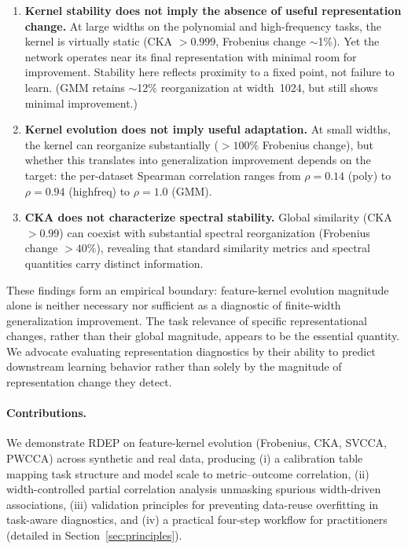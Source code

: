 \documentclass[10pt]{article}
\begin{document}
\begin{enumerate}
    \item \textbf{Kernel stability does not imply the absence of useful representation change.}  At large widths on the polynomial and high-frequency tasks, the kernel is virtually static (CKA $>0.999$, Frobenius change $\sim$1\%). Yet the network operates near its final representation with minimal room for improvement. Stability here reflects proximity to a fixed point, not failure to learn.  (GMM retains $\sim$12\% reorganization at width~1024, but still shows minimal improvement.)
    \item \textbf{Kernel evolution does not imply useful adaptation.}  At small widths, the kernel can reorganize substantially ($>100\%$ Frobenius change), but whether this translates into generalization improvement depends on the target: the per-dataset Spearman correlation ranges from $\rho=0.14$ (poly) to $\rho=0.94$ (highfreq) to $\rho=1.0$ (GMM).
    \item \textbf{CKA does not characterize spectral stability.}  Global similarity (CKA $>0.99$) can coexist with substantial spectral reorganization (Frobenius change $>40\%$), revealing that standard similarity metrics and spectral quantities carry distinct information.
\end{enumerate}

These findings form an empirical boundary: feature-kernel evolution magnitude alone is neither necessary nor sufficient as a diagnostic of finite-width generalization improvement.  The task relevance of specific representational changes, rather than their global magnitude, appears to be the essential quantity.  We advocate evaluating representation diagnostics by their ability to predict downstream learning behavior rather than solely by the magnitude of representation change they detect.

\paragraph{Contributions.}
We demonstrate RDEP on feature-kernel evolution (Frobenius, CKA, SVCCA, PWCCA) across synthetic and real data, producing (i) a calibration table mapping task structure and model scale to metric--outcome correlation, (ii) width-controlled partial correlation analysis unmasking spurious width-driven associations, (iii) validation principles for preventing data-reuse overfitting in task-aware diagnostics, and (iv) a practical four-step workflow for practitioners (detailed in Section~\ref{sec:principles}).
\end{document}
